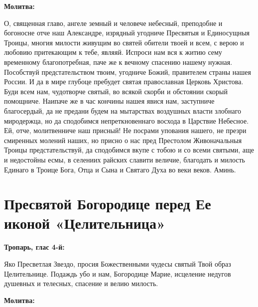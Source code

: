 \bfseries Молитва:\normalfont{}


О, священная главо, ангеле земный и человече небесный, преподобне и богоносне отче наш Александре, изрядный угодниче Пресвятыя и Единосущныя Троицы, многия милости живущим во святей обители твоей и всем, с верою и любовию притекающим к тебе, являяй. Испроси нам вся к житию сему временному благопотребная, паче же к вечному спасению нашему нужная. Пособствуй предстательством твоим, угодниче Божий, правителем страны нашея России. И да в мире глубоце пребудет святая православная Церковь Христова. Буди всем нам, чудотворче святый, во всякой скорби и обстоянии скорый помощниче. Наипаче же в час кончины нашея явися нам, заступниче благосердый, да не предани будем на мытарствах воздушных власти злобнаго миродержца, но да сподобимся непреткновеннаго восхода в Царствие Небесное. Ей, отче, молитвенниче наш присный! Не посрами упования нашего, не презри смиренных молений наших, но присно о нас пред Престолом Живоначальныя Троицы предстательствуй, да сподобимся вкупе с тобою и со всеми святыми, аще и недостойны есмы, в селениих райских славити величие, благодать и милость Единаго в Троице Бога, Отца и Сына и Святаго Духа во веки веков. Аминь.

\bigskip\bigskip\mychapterending


 

\section{Пресвятой Богородице перед Ее иконой «Целительница»}
 

\bfseries Тропарь, глас 4-й:\normalfont{}


Яко Пресветлая Звездо, просия Божественными чудесы святый Твой образ Целительнице. Подаждь убо и нам, Богородице Марие, исцеление недугов душевных и телесных, спасение и велию милость.


\medskip


\bfseries Молитва:\normalfont{}


